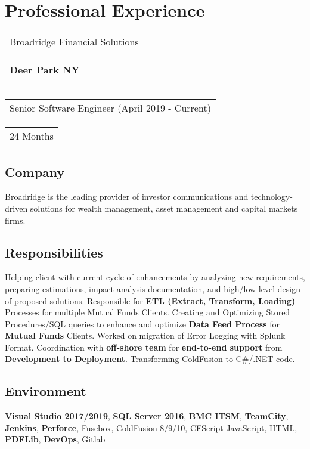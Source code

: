 \documentclass[letterpaper,11pt]{article}
\begin{document}
    \section{Professional Experience}


    \vspace{0.64cm}
    \noindent
    \begin{tabular}[t]{@{}l}
    \Large{Broadridge Financial Solutions}
    \end{tabular}
    \hfill
    \begin{tabular}[t]{l@{}}
    \textbf{Deer Park NY}
    \end{tabular}
    \noindent\rule{\textwidth}{0.5pt}
    \begin{tabular}[t]{@{}l}
    Senior Software Engineer (April 2019 - Current)
    \end{tabular}
    \hfill
    \begin{tabular}[t]{l@{}}
    24 Months
    \end{tabular}

    \subsection{Company}
    Broadridge is the leading provider of investor communications and technology-driven solutions for wealth management, asset management and capital markets firms.

    \subsection{Responsibilities}
    Helping client with current cycle of enhancements by analyzing new requirements, preparing estimations, impact analysis documentation, and high/low level design of proposed solutions. Responsible for \textbf{ETL (Extract, Transform, Loading)} Processes for multiple Mutual Funds Clients. Creating and Optimizing Stored Procedures/SQL queries to enhance and optimize \textbf{Data Feed Process} for \textbf{Mutual Funds} Clients. Worked on migration of Error Logging with Splunk Format. Coordination with \textbf{off-shore team} for \textbf{end-to-end support} from \textbf{Development to Deployment}. Transforming ColdFusion to C\#/.NET code.

    \subsection{Environment}
    \textbf{Visual Studio 2017/2019}, \textbf{SQL Server 2016}, \textbf{BMC ITSM}, \textbf{TeamCity}, \textbf{Jenkins}, \textbf{Perforce}, Fusebox,  ColdFusion 8/9/10, CFScript JavaScript, HTML, \textbf{PDFLib}, \textbf{DevOps}, Gitlab
\end{document}
